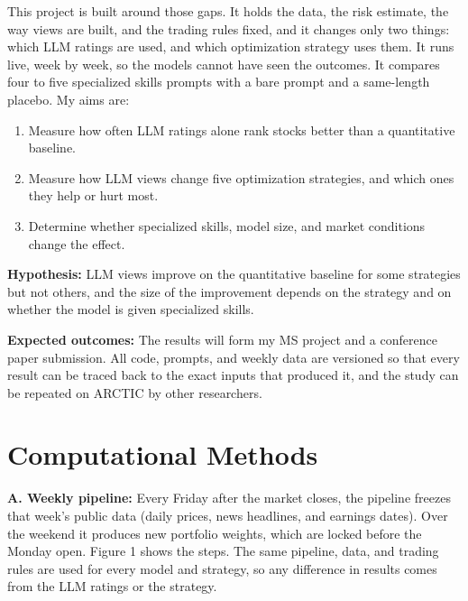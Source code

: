 \documentclass[11pt,letterpaper]{article}
\begin{document}
This project is built around those gaps. It holds the data, the risk estimate, the way views are built, and the trading rules fixed, and it changes only two things: which LLM ratings are used, and which optimization strategy uses them. It runs live, week by week, so the models cannot have seen the outcomes. It compares four to five specialized skills prompts with a bare prompt and a same-length placebo. My aims are:
\begin{enumerate}
\item[\textbf{1:}] Measure how often LLM ratings alone rank stocks better than a quantitative baseline.
\item[\textbf{2:}] Measure how LLM views change five optimization strategies, and which ones they help or hurt most.
\item[\textbf{3:}] Determine whether specialized skills, model size, and market conditions change the effect.
\end{enumerate}
\textbf{Hypothesis:} LLM views improve on the quantitative baseline for some strategies but not others, and the size of the improvement depends on the strategy and on whether the model is given specialized skills.

\textbf{Expected outcomes:} The results will form my MS project and a conference paper submission. All code, prompts, and weekly data are versioned so that every result can be traced back to the exact inputs that produced it, and the study can be repeated on ARCTIC by other researchers.

\section{Computational Methods}
\textbf{A. Weekly pipeline:} Every Friday after the market closes, the pipeline freezes that week's public data (daily prices, news headlines, and earnings dates). Over the weekend it produces new portfolio weights, which are locked before the Monday open. Figure 1 shows the steps. The same pipeline, data, and trading rules are used for every model and strategy, so any difference in results comes from the LLM ratings or the strategy.
\end{document}
